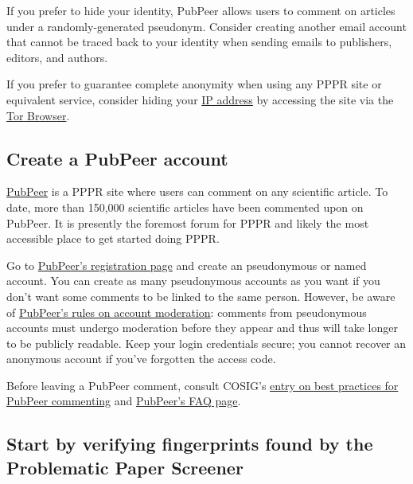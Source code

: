 \documentclass[letterpaper, 12pt]{article}
\begin{document}
If you prefer to hide your identity, PubPeer allows users to comment on articles under a randomly-generated pseudonym. Consider creating another email account that cannot be traced back to your identity when sending emails to publishers, editors, and authors. 

If you prefer to guarantee complete anonymity when using any PPPR site or equivalent service, consider hiding your \href{https://en.wikipedia.org/wiki/IP_address}{IP address} by accessing the site via the \href{https://www.torproject.org/}{Tor Browser}.

\subsection*{Create a PubPeer account}

\href{https://pubpeer.com/}{PubPeer} is a PPPR site where users can comment on any scientific article. To date, more than 150,000 scientific articles have been commented upon on PubPeer. It is presently the foremost forum for PPPR and likely the most accessible place to get started doing PPPR.

Go to \href{https://pubpeer.com/register}{PubPeer's registration page} and create an pseudonymous or named account.
You can create as many pseudonymous accounts as you want if you don't want some comments to be linked to the same person.
However, be aware of \href{https://pubpeer.com/static/faq#24}{PubPeer's rules on account moderation}: comments from pseudonymous accounts must undergo moderation before they appear and thus will take longer to be publicly readable. Keep your login credentials secure; you cannot recover an anonymous account if you've forgotten the access code.

Before leaving a PubPeer comment, consult COSIG's \href{https://osf.io/sghaq}{entry on best practices for PubPeer commenting} and \href{https://pubpeer.com/static/faq}{PubPeer's FAQ page}.

\subsection*{Start by verifying fingerprints found by the Problematic Paper Screener}
\end{document}

